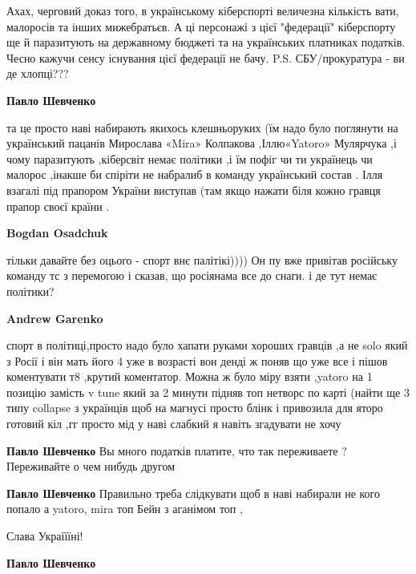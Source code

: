 \begin{itemize}
\begin{itemize}
\end{itemize} %


Ахах, черговий доказ того, в українському кіберспорті величезна кількість вати,
малоросів та інших мижебратьєв. А ці персонажі з цієї "федерації" кіберспорту
ще й паразитують на державному бюджеті та на українських платниках податків.
Чесно кажучи сенсу існування цієї федерації не бачу. P.S. СБУ/прокуратура - ви
де хлопці???

\begin{itemize} %
\textbf{Павло Шевченко} 

та це просто наві набирають якихось клешньоруких (їм надо було поглянути на
український пацанів Мирослава «Mira» Колпакова ,Іллю«Yatoro» Мулярчука ,і чому
паразитують ,кіберсвіт немає політики ,і їм пофіг чи ти українець чи малорос
,інакше би спіріти не набралиб в команду український состав . Ілля взагалі під
прапором України виступав (там якщо нажати біля кожно гравця прапор своєї
країни .

\begin{itemize} %
\textbf{Bogdan Osadchuk} 

тільки давайте без оцього - спорт внє палітікі)))) Он пу вже привітав російську
команду тс з перемогою і сказав, що росіянама все до снаги. і де тут немає
політики?

\textbf{Andrew Garenko} 

спорт в політиці,просто надо було хапати руками хороших гравців ,а не solo який
з Росії і він мать його 4 уже в возрасті вон денді ж поняв що уже все і пішов
коментувати т8 ,крутий коментатор. Можна ж було міру взяти ,yatoro на 1 позицію
замість v tune який за 2 минути підняв топ нетворс по карті (найти ще 3 типу
collapse з українців щоб на магнусі просто блінк і привозила для яторо готовий
кіл ,гг просто мід у наві слабкий я навіть згадувати не хочу

\end{itemize} %

\textbf{Павло Шевченко} Вы много податків платите, что так переживаете ? Переживайте о чем нибудь другом

\textbf{Павло Шевченко} Правильно треба слідкувати щоб в наві набирали не кого попало а yatoro, mira топ Бейн з аганімом топ ,

Слава Україїїні!

\textbf{Павло Шевченко} 


\end{itemize}
\end{itemize}
